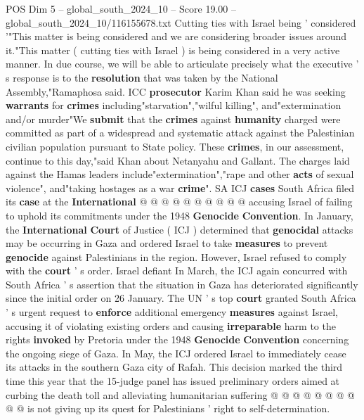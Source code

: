 \begin{textsample}{POS Dim 5 – global\_south\_2024\_10 – Score 19.00 – global\_south\_2024\_10/116155678.txt}  \label{ex:f5_pos_323}
Cutting ties with Israel being ' considered '"This matter is being considered and we are considering broader issues around it."This matter ( cutting ties with Israel ) is being considered in a very active manner.
In due course, we will be able to articulate precisely what the executive ' s response is to the \textbf{resolution} that was taken by the National Assembly,"Ramaphosa said.
ICC \textbf{prosecutor} Karim Khan said he was seeking \textbf{warrants} for \textbf{crimes} including"starvation","wilful killing", and"extermination and/or murder"We \textbf{submit} that the \textbf{crimes} against \textbf{humanity} charged were committed as part of a widespread and systematic attack against the Palestinian civilian population pursuant to State policy.
These \textbf{crimes}, in our assessment, continue to this day,"said Khan about Netanyahu and Gallant.
The charges laid against the Hamas leaders include"extermination","rape and other \textbf{acts} of sexual violence", and"taking hostages as a war \textbf{crime}".
SA ICJ \textbf{cases} South Africa filed its \textbf{case} at the \textbf{International} @ @ @ @ @ @ @ @ @ @ accusing Israel of failing to uphold its commitments under the 1948 \textbf{Genocide} \textbf{Convention}.
In January, the \textbf{International} \textbf{Court} of Justice ( ICJ ) determined that \textbf{genocidal} attacks may be occurring in Gaza and ordered Israel to take \textbf{measures} to prevent \textbf{genocide} against Palestinians in the region.
However, Israel refused to comply with the \textbf{court} ' s order.
Israel defiant In March, the ICJ again concurred with South Africa ' s assertion that the situation in Gaza has deteriorated significantly since the initial order on 26 January.
The UN ' s top \textbf{court} granted South Africa ' s urgent request to \textbf{enforce} additional emergency \textbf{measures} against Israel, accusing it of violating existing orders and causing \textbf{irreparable} harm to the rights \textbf{invoked} by Pretoria under the 1948 \textbf{Genocide} \textbf{Convention} concerning the ongoing siege of Gaza.
In May, the ICJ ordered Israel to immediately cease its attacks in the southern Gaza city of Rafah.
This decision marked the third time this year that the 15-judge panel has issued preliminary orders aimed at curbing the death toll and alleviating humanitarian suffering @ @ @ @ @ @ @ @ @ @ is not giving up its quest for Palestinians ' right to self-determination.

\end{textsample}
